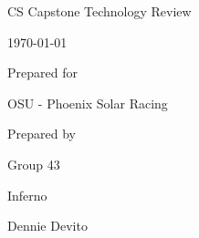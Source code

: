 \documentclass[onecolumn, draftclsnofoot,10pt, compsoc]{IEEEtran}
\def \CapstoneTeamName{		Inferno}
\def \CapstoneTeamNumber{		43}
\def \GroupMemberOne{			Dennie Devito}
\def \GroupMemberTwo{			Logan Kling}
\def \GroupMemberThree{			Dakota Zaengle}
\def \CapstoneSponsorCompany{	OSU - Phoenix Solar Racing}
\def \CapstoneSponsorPerson{		Cailin Moore}
\def \DocType{		%
				Technology Review
				}
\newcommand{\NameSigPair}[1]{\par
\makebox[2.75in][r]{#1} \hfil 	\makebox[3.25in]{\makebox[2.25in]{\hrulefill} \hfill		\makebox[.75in]{\hrulefill}}
\par\vspace{-12pt} \textit{\tiny\noindent
\makebox[2.75in]{} \hfil		\makebox[3.25in]{\makebox[2.25in][r]{Signature} \hfill	\makebox[.75in][r]{Date}}}}
\begin{document}
\begin{singlespace}
\begin{titlepage}

        \hfill 
        \par\vspace{.2in}
        \centering
        \scshape{
            \huge CS Capstone \DocType \par
            {\large\today}\par
            \vspace{.5in}
            {\large Prepared for}\par
            \Huge \CapstoneSponsorCompany\par
            \vspace{5pt}
            {\large Prepared by }\par
            Group\CapstoneTeamNumber\par
            \CapstoneTeamName\par 
            \vspace{5pt}
            {\Large
               Dennie Devito%
            }
            \vspace{20pt}
        }
\end{titlepage}
\newpage
{}
\tableofcontents
\newpage


\end{singlespace}
\end{document}
